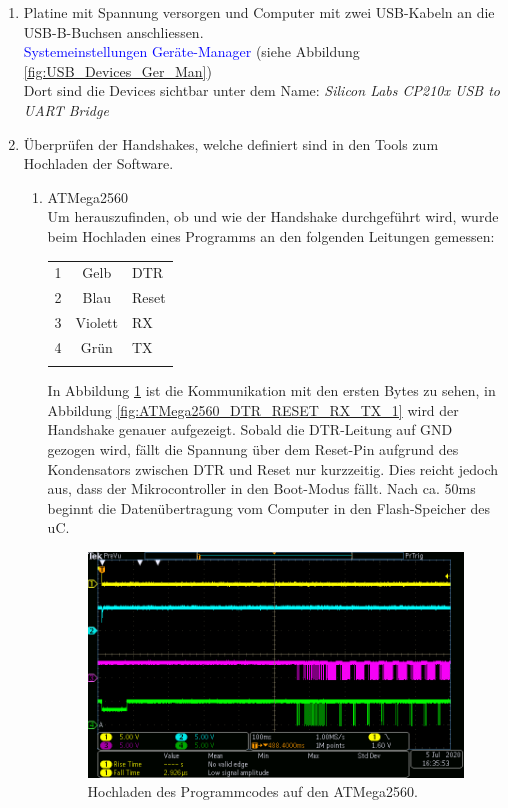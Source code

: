 \begin{enumerate}
\item Platine mit Spannung versorgen und Computer mit zwei USB-Kabeln an die USB-B-Buchsen anschliessen.\\
\textcolor{blue}{Systemeinstellungen \textrightarrow Geräte-Manager} (siehe Abbildung \ref{fig:USB_Devices_Ger_Man})\\
Dort sind die Devices sichtbar unter dem Name: \textit{Silicon Labs CP210x USB to UART Bridge}\newline

\item Überprüfen der Handshakes, welche definiert sind in den Tools zum Hochladen der Software.

\begin{enumerate}
\item ATMega2560\\
Um herauszufinden, ob und wie der Handshake durchgeführt wird, wurde beim Hochladen eines Programms an den folgenden Leitungen gemessen:\\

\begin{tabular}{lcl}
1 & Gelb & DTR\\
2 & Blau & Reset\\
3 & Violett & RX\\
4 & Grün & TX\\
\\
\end{tabular}
In Abbildung \ref{fig:ATMega2560_DTR_RESET_RX_TX_gesamt} ist die Kommunikation mit den ersten Bytes zu sehen, in Abbildung \ref{fig:ATMega2560_DTR_RESET_RX_TX_1} wird der Handshake genauer aufgezeigt. Sobald die DTR-Leitung auf GND gezogen wird, fällt die Spannung über dem Reset-Pin aufgrund des Kondensators zwischen DTR und Reset nur kurzzeitig. Dies reicht jedoch aus, dass der Mikrocontroller in den Boot-Modus fällt. Nach ca. 50ms beginnt die Datenübertragung vom Computer in den Flash-Speicher des uC.

\begin{figure}[h!]
\center
\includegraphics[width = \textwidth]{graphics/ATMega2560_DTR_RESET_RX_TX_gesamt}
\caption{Hochladen des Programmcodes auf den ATMega2560.}
\label{fig:ATMega2560_DTR_RESET_RX_TX_gesamt}
\end{figure}


\end{enumerate}
\end{enumerate}
